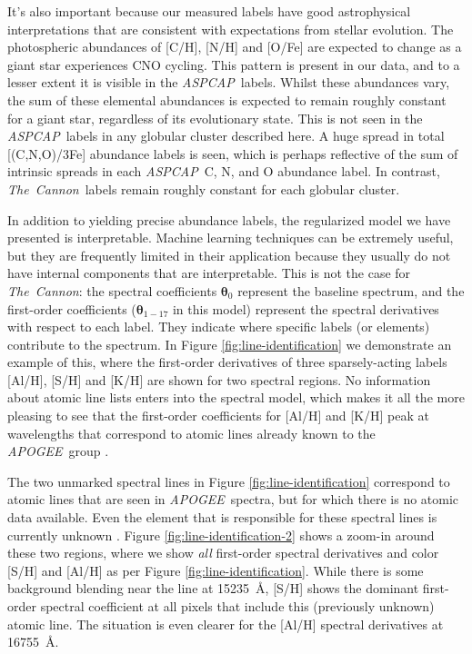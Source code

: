 \documentclass[12pt,preprint]{aastex}
\newcommand{\project}[1]{\textsl{#1}}
\newcommand{\TheCannon}{\project{The~Cannon}}
\newcommand{\acronym}[1]{{\small{#1}}}
\newcommand{\apogee}{\project{\acronym{APOGEE}}}
\newcommand{\aspcap}{\project{\acronym{ASPCAP}}}
\newcommand{\Dvector}[1]{\boldsymbol{#1}}
\newcommand{\vectheta}{\Dvector{\theta}}
\begin{document}
It's also important because our measured labels have good astrophysical
interpretations that are consistent with expectations from stellar
evolution.  The photospheric abundances of [C/H], [N/H] and [O/Fe] 
are expected to change as a giant star experiences CNO cycling.  This pattern is
present in our data, and to a lesser extent it is visible in the
\aspcap\ labels.  Whilst these abundances vary, the sum of these
elemental abundances is expected to remain roughly constant for a
giant star, regardless of its evolutionary state.  This is not 
seen in the \aspcap\ labels in any globular cluster described here.  
A huge spread in total [(C,N,O)/3Fe] abundance labels is seen, 
which is perhaps reflective of the sum of intrinsic spreads in
each \aspcap\ C, N, and O abundance label.  In contrast, \TheCannon\
labels remain roughly constant for each globular cluster.


In addition to yielding precise abundance labels, the regularized model
we have presented is interpretable.  Machine learning techniques can be extremely
useful, but they are frequently limited in their application because they
usually do not have internal components that are interpretable.  This is
not the case for \TheCannon: the spectral coefficients $\vectheta_0$
represent the baseline spectrum, and the first-order coefficients 
($\vectheta_{1-17}$ in this model) represent the spectral derivatives with
respect to each label.  They indicate where specific labels (or elements)
contribute to the spectrum.  In Figure \ref{fig:line-identification} we
demonstrate an example of this, where the first-order derivatives of three
sparsely-acting labels [Al/H], [S/H] and [K/H] are shown for two spectral
regions.  No information about atomic line lists enters into the spectral
model, which makes it all the more pleasing to see that the first-order
coefficients for [Al/H] and [K/H] peak at wavelengths that correspond to
atomic lines already known to the \apogee\ group \citep{Smith_2013}. 


The two unmarked spectral lines in Figure \ref{fig:line-identification} correspond
to atomic lines that are seen in \apogee\ spectra, but for which there is
no atomic data available.  Even the element that
is responsible for these spectral lines is currently unknown \citep{Shetrone_2015}.
Figure \ref{fig:line-identification-2} shows a zoom-in around these
two regions, where we show \emph{all} first-order spectral derivatives and
color [S/H] and [Al/H] as per Figure \ref{fig:line-identification}.  While
there is some background blending near the line at 15235~\AA{}, [S/H] shows
the dominant first-order spectral coefficient at all pixels that include
this (previously unknown) atomic line.  The situation is even clearer for
the [Al/H] spectral derivatives at 16755~\AA{}.  
\end{document}
